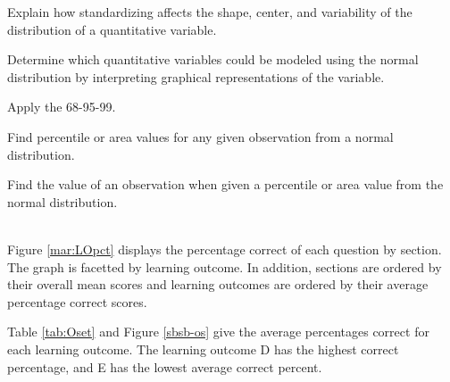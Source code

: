 \documentclass[12pt,nohyper]{tufte-handout}\usepackage[]{graphicx}\usepackage[]{color}
\begin{document}
 \bigskip{} 

Explain how standardizing affects the shape, center, and variability of the distribution of a quantitative variable.

 \bigskip{} 

Determine which quantitative variables could be modeled using the normal distribution by interpreting graphical representations of the variable.

 \bigskip{} 

Apply the 68-95-99.

 \bigskip{} 

Find percentile or area values for any given observation from a normal distribution.

 \bigskip{} 

Find the value of an observation when given a percentile or area value from the normal distribution.
\\ 
 ~~ 


\clearpage
\newpage{}

Figure \ref{mar:LOpct} displays the percentage correct of each question by section. The graph is facetted by learning outcome. In addition, sections are ordered by their overall mean scores and learning outcomes are ordered by their average percentage correct scores.

Table \ref{tab:Oset} and Figure \ref{sbsb-os} give the average percentages correct for each learning outcome. The learning outcome D has the highest correct percentage, and  E has the lowest average correct percent.
\end{document}
